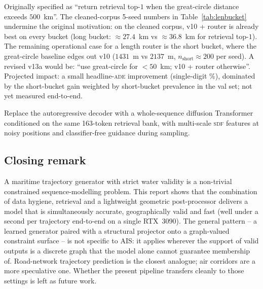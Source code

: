 \documentclass[oneside, a4paper, onecolumn, 11pt]{article}
\newcommand{\ade}{\textsc{ade}}
\newcommand{\sdf}{\textsc{sdf}}
\begin{document}
\begin{description}[leftmargin=*,style=nextline]
  \item[v13a -- length-conditioned router.]
        Originally specified as ``return retrieval top-$1$ when the
        great-circle distance exceeds $500$~km''.  The cleaned-corpus
        5-seed numbers in Table~\ref{tab:lenbucket} undermine the
        original motivation: on the cleaned corpus, v10 + router is
        already best on every bucket (long bucket:
        $\approx 27.4$~km vs $\approx 36.8$~km for retrieval
        top-$1$).  The remaining operational case for a length
        router is the short bucket, where the great-circle baseline
        edges out v10 ($1431$~m vs $2137$~m,
        $n_{\text{short}} \approx 200$ per seed).  A revised v13a
        would be: ``use great-circle for $<\!50$~km; v10 + router
        otherwise''.  Projected impact: a small headline-\ade{}
        improvement (single-digit \%), dominated by the short-bucket
        gain weighted by short-bucket prevalence in the val set;
        not yet measured end-to-end.
  \item[v13b -- TrajDiff.]
        Replace the autoregressive decoder with a whole-sequence
        diffusion Transformer conditioned on the same 163-token
        retrieval bank, with multi-scale \sdf{} features at noisy
        positions and classifier-free guidance during sampling.
\end{description}

\subsection{Closing remark}

A maritime trajectory generator with strict water validity is a
non-trivial constrained sequence-modelling problem.  This report
shows that the combination of data hygiene, retrieval and a
lightweight geometric post-processor delivers a model that is
simultaneously accurate, geographically valid and fast (well under
a second per trajectory end-to-end on a single RTX~3090).  The
general pattern -- a learned generator paired with a structural
projector onto a graph-valued constraint surface -- is not specific
to AIS: it applies wherever the support of valid outputs is a
discrete graph that the model alone cannot guarantee membership of.
Road-network trajectory prediction is the closest analogue; air
corridors are a more speculative one.  Whether the present pipeline
transfers cleanly to those settings is left as future work.
\end{document}
